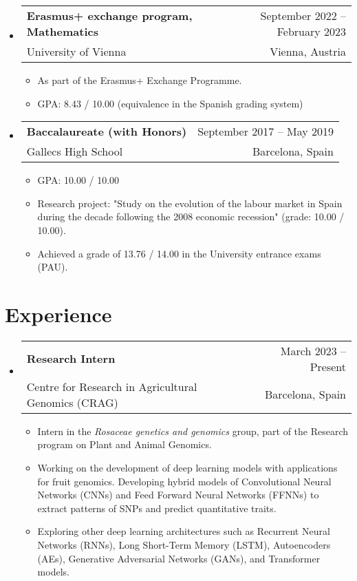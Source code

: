 \documentclass[a4paper,11pt]{article}
\makeatletter
\newcommand{\resumeQuadHeading}[4]{
  \item
  \begin{tabular*}{0.96\textwidth}[t]{l@{\extracolsep{\fill}}r}
    \textbf{#1} & \small #2 \\
    \small#3 & \small #4 \\
  \end{tabular*}
}
\newcommand{\resumeHeadingListStart}{
  \begin{itemize}[leftmargin=0.15in, label={}]
}
\newcommand{\resumeHeadingListEnd}{\end{itemize}}
\makeatother
\begin{document}
  \resumeHeadingListStart{}
    \resumeQuadHeading{Erasmus+ exchange program, Mathematics}{September 2022 – February 2023}
    {University of Vienna}{Vienna, Austria}
    \begin{itemize}[leftmargin=3em, itemsep=0.1em, topsep=2pt]
        \item \small As part of the Erasmus+ Exchange Programme.  
        \item \small GPA: 8.43 / 10.00 (equivalence in the Spanish grading system)
    \end{itemize}
  \resumeHeadingListEnd{}
  
  \resumeHeadingListStart{}
    \resumeQuadHeading{Baccalaureate (with Honors)}{September 2017 – May 2019}
    {Gallecs High School}{Barcelona, Spain}
    \begin{itemize}[leftmargin=3em, itemsep=0.1em, topsep=2pt]
      \item \small GPA: 10.00 / 10.00
      \item \small Research project: "Study on the evolution of the labour market in Spain during the decade following the 2008 economic recession" (grade: 10.00 / 10.00).
      \item \small Achieved a grade of 13.76 / 14.00 in the University entrance exams (PAU).
    \end{itemize}
  \resumeHeadingListEnd{}


\section{Experience}
  \resumeHeadingListStart{}
    \resumeQuadHeading{Research Intern}{March 2023 – Present}
    {Centre for Research in Agricultural Genomics (CRAG)}{Barcelona, Spain}
    \begin{itemize}[leftmargin=3em, itemsep=0.1em, topsep=2pt]
      \item \small Intern in the \textit{Rosaceae genetics and genomics} group, part of the Research program on Plant and Animal Genomics.
      \item \small Working on the development of deep learning models with applications for fruit genomics. Developing hybrid models of Convolutional Neural Networks (CNNs) and Feed Forward Neural Networks (FFNNs) to extract patterns of SNPs and predict quantitative traits.
      \item \small Exploring other deep learning architectures such as Recurrent Neural Networks (RNNs), Long Short-Term Memory (LSTM), Autoencoders (AEs), Generative Adversarial Networks (GANs), and Transformer models.
    \end{itemize}
  \resumeHeadingListEnd{}
\end{document}
